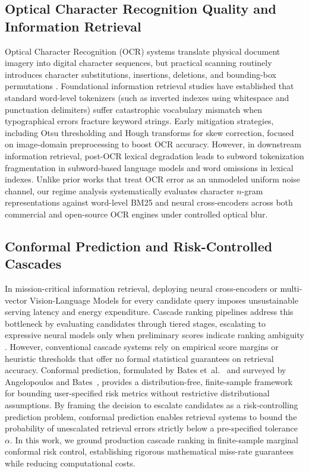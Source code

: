 \documentclass[conference]{IEEEtran}
\begin{document}
\subsection{Optical Character Recognition Quality and Information Retrieval}
Optical Character Recognition (OCR) systems translate physical document imagery into digital character sequences, but practical scanning routinely introduces character substitutions, insertions, deletions, and bounding-box permutations \cite{smith2007tesseract, fateh2024ocr}. Foundational information retrieval studies have established that standard word-level tokenizers (such as inverted indexes using whitespace and punctuation delimiters) suffer catastrophic vocabulary mismatch when typographical errors fracture keyword strings. Early mitigation strategies, including Otsu thresholding \cite{otsu1979} and Hough transforms \cite{hough1962} for skew correction, focused on image-domain preprocessing to boost OCR accuracy. However, in downstream information retrieval, post-OCR lexical degradation leads to subword tokenization fragmentation in subword-based language models and word omissions in lexical indexes. Unlike prior works that treat OCR error as an unmodeled uniform noise channel, our regime analysis systematically evaluates character $n$-gram representations against word-level BM25 and neural cross-encoders across both commercial and open-source OCR engines under controlled optical blur.

\subsection{Conformal Prediction and Risk-Controlled Cascades}
In mission-critical information retrieval, deploying neural cross-encoders or multi-vector Vision-Language Models for every candidate query imposes unsustainable serving latency and energy expenditure. Cascade ranking pipelines address this bottleneck by evaluating candidates through tiered stages, escalating to expressive neural models only when preliminary scores indicate ranking ambiguity \cite{wang2011cascade, gallagher2019cascade}. However, conventional cascade systems rely on empirical score margins or heuristic thresholds that offer no formal statistical guarantees on retrieval accuracy. Conformal prediction, formulated by Bates et~al.~\cite{bates2021conformal} and surveyed by Angelopoulos and Bates~\cite{angelopoulos2021gentle}, provides a distribution-free, finite-sample framework for bounding user-specified risk metrics without restrictive distributional assumptions. By framing the decision to escalate candidates as a risk-controlling prediction problem, conformal prediction enables retrieval systems to bound the probability of unescalated retrieval errors strictly below a pre-specified tolerance $\alpha$. In this work, we ground production cascade ranking in finite-sample marginal conformal risk control, establishing rigorous mathematical miss-rate guarantees while reducing computational costs.
\end{document}
